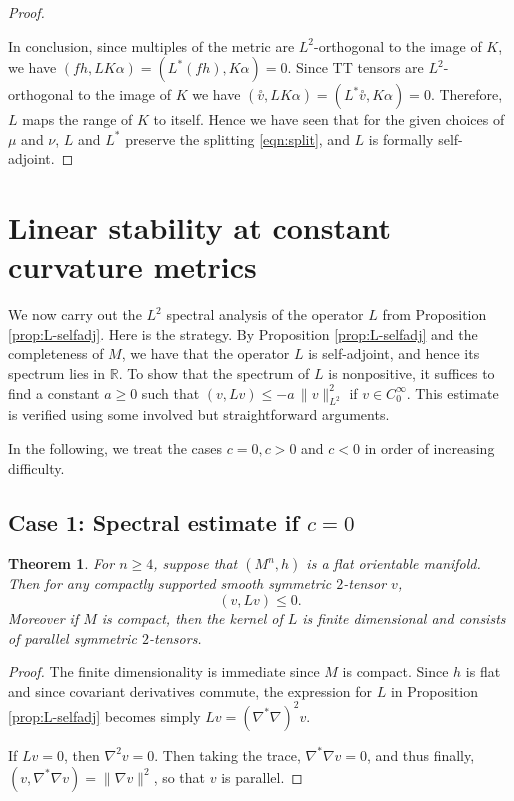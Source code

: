 \documentclass[10pt,reqno]{amsart}
\newtheorem{theorem}{Theorem}[section]
\newcommand{\ttv}{\stackrel{\circ}{v}}
\begin{document}
\begin{proof}
\
 
In conclusion, since multiples of the metric are $L^2$-orthogonal to the image of $K$, we have $(f h, L K \alpha ) = (L^*( fh ), K \alpha) = 0$.  
Since TT tensors are $L^2$-orthogonal to the image of $K$ we have $( \ttv, L K \alpha ) = (L^*\ttv, K \alpha) = 0$.  
Therefore, $L$ maps the range of $K$ to itself. Hence we have seen that for the given choices of $\mu$ and $\nu$, $L$ and $L^*$  preserve the 
splitting \eqref{eqn:split}, and $L$ is formally self-adjoint. 
\end{proof}

\section{Linear stability at constant curvature metrics} \label{sec:l2spec}
We now carry out the $L^2$ spectral analysis of the operator $L$ from Proposition \ref{prop:L-selfadj}. Here is the strategy.  By Proposition \ref{prop:L-selfadj} and the completeness of $M$, we have that the operator $L$ is self-adjoint, and hence its spectrum lies in $\mathbb R$. To show that the spectrum of $L$ is nonpositive,
it suffices to find a constant $a \ge 0$ such that $(v, Lv) \leq -a\, \|v\|^2_{L^2}$ if $v \in C^\infty_0$.  This estimate is verified using some involved but straightforward
arguments.  

In the following, we treat the cases $c = 0, c > 0$ and $c<0$ in order of increasing difficulty.

\bigskip

\subsection {\bf Case 1: Spectral estimate if $c=0$} 
\begin{theorem} \label{thm:main1a}
For $n \geq 4$, suppose that $(M^n,h)$ is a flat orientable manifold.  Then for any compactly supported smooth symmetric $2$-tensor $v$,
\[ 
(v,Lv) \leq 0. 
\] 
Moreover if $M$ is compact, then the kernel of $L$ is finite dimensional and consists of parallel symmetric $2$-tensors.
\end{theorem}
\begin{proof} 
The finite dimensionality is immediate since $M$ is compact.  Since $h$ is flat and since covariant derivatives commute, the expression for $L$ in Proposition \ref{prop:L-selfadj} becomes simply 
$Lv = (\nabla^* \nabla)^2 v$. 

If $Lv = 0$, then $\nabla^2 v = 0$. Then taking the trace, $\nabla^*\nabla  v = 0$, and thus finally, $(v, \nabla^* \nabla v) = \|\nabla v\|^2$, so that
$v$ is parallel. 
\end{proof}
\end{document}
